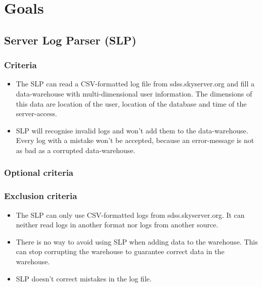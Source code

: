 \section{Goals}

\subsection{Server Log Parser (SLP)}

\subsubsection{Criteria} %
\begin{itemize}
\item The SLP can read a CSV-formatted log file from sdss.skyserver.org
 and fill a data-warehouse with multi-dimensional user information.
 The dimensions of this data are location of the user, location of the 
 database and time of the server-access. 
\item SLP will recognise invalid logs and won't add them to the data-warehouse.
 Every log with a mistake won't be accepted, because an error-message is not 
 as bad as a corrupted data-warehouse. 
\end{itemize}

\subsubsection{Optional criteria}

\subsubsection{Exclusion criteria}
\begin{itemize}
\item The SLP can only use CSV-formatted logs from sdss.skyserver.org. 
It can neither read logs in another format nor logs
from another source.
\item There is no way to avoid using SLP when adding data to the warehouse. 
This can stop corrupting the warehouse to guarantee correct data in the warehouse.
\item SLP doesn't correct mistakes in the log file.
\end{itemize}



